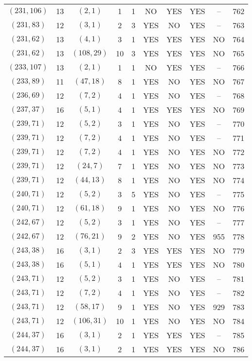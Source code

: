 \begin{longtable}{|c|c|c|c|c|c|c|c|c|c|}
$(231, 106)$ & 13 & $(2, 1)$ & 1 & 1 & NO & YES & YES & -- & 762\\
$(231, 83)$ & 12 & $(3, 1)$ & 2 & 3 & YES & NO & YES & -- & 763\\
$(231, 62)$ & 13 & $(4, 1)$ & 3 & 1 & YES & YES & YES & NO & 764\\
$(231, 62)$ & 13 & $(108, 29)$ & 10 & 3 & YES & YES & YES & NO & 765\\
$(233, 107)$ & 13 & $(2, 1)$ & 1 & 1 & NO & YES & YES & -- & 766\\
$(233, 89)$ & 11 & $(47, 18)$ & 8 & 1 & YES & NO & YES & NO & 767\\
$(236, 69)$ & 12 & $(7, 2)$ & 4 & 1 & YES & NO & YES & -- & 768\\
$(237, 37)$ & 16 & $(5, 1)$ & 4 & 1 & YES & YES & YES & NO & 769\\
$(239, 71)$ & 12 & $(5, 2)$ & 3 & 1 & YES & NO & YES & -- & 770\\
$(239, 71)$ & 12 & $(7, 2)$ & 4 & 1 & YES & NO & YES & -- & 771\\
$(239, 71)$ & 12 & $(7, 2)$ & 4 & 1 & YES & NO & YES & NO & 772\\
$(239, 71)$ & 12 & $(24, 7)$ & 7 & 1 & YES & NO & YES & NO & 773\\
$(239, 71)$ & 12 & $(44, 13)$ & 8 & 1 & YES & NO & YES & NO & 774\\
$(240, 71)$ & 12 & $(5, 2)$ & 3 & 5 & YES & NO & YES & -- & 775\\
$(240, 71)$ & 12 & $(61, 18)$ & 9 & 1 & YES & NO & YES & NO & 776\\
$(242, 67)$ & 12 & $(5, 2)$ & 3 & 1 & YES & NO & YES & -- & 777\\
$(242, 67)$ & 12 & $(76, 21)$ & 9 & 2 & YES & NO & YES & 955 & 778\\
$(243, 38)$ & 16 & $(3, 1)$ & 2 & 3 & YES & YES & YES & NO & 779\\
$(243, 38)$ & 16 & $(5, 1)$ & 4 & 1 & YES & YES & YES & NO & 780\\
$(243, 71)$ & 12 & $(5, 2)$ & 3 & 1 & YES & NO & YES & -- & 781\\
$(243, 71)$ & 12 & $(7, 2)$ & 4 & 1 & YES & NO & YES & -- & 782\\
$(243, 71)$ & 12 & $(58, 17)$ & 9 & 1 & YES & NO & YES & 929 & 783\\
$(243, 71)$ & 12 & $(106, 31)$ & 10 & 1 & YES & NO & YES & NO & 784\\
$(244, 37)$ & 16 & $(3, 1)$ & 2 & 1 & YES & YES & YES & -- & 785\\
$(244, 37)$ & 16 & $(3, 1)$ & 2 & 1 & YES & YES & YES & NO & 786\\

\end{longtable}
